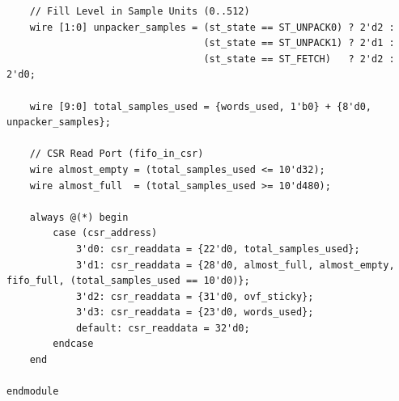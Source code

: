 \begin{lstlisting}
    // Fill Level in Sample Units (0..512)
    wire [1:0] unpacker_samples = (st_state == ST_UNPACK0) ? 2'd2 :
                                  (st_state == ST_UNPACK1) ? 2'd1 :
                                  (st_state == ST_FETCH)   ? 2'd2 : 2'd0;

    wire [9:0] total_samples_used = {words_used, 1'b0} + {8'd0, unpacker_samples};

    // CSR Read Port (fifo_in_csr)
    wire almost_empty = (total_samples_used <= 10'd32);
    wire almost_full  = (total_samples_used >= 10'd480);

    always @(*) begin
        case (csr_address)
            3'd0: csr_readdata = {22'd0, total_samples_used};
            3'd1: csr_readdata = {28'd0, almost_full, almost_empty, fifo_full, (total_samples_used == 10'd0)};
            3'd2: csr_readdata = {31'd0, ovf_sticky};
            3'd3: csr_readdata = {23'd0, words_used};
            default: csr_readdata = 32'd0;
        endcase
    end

endmodule
\end{lstlisting}

